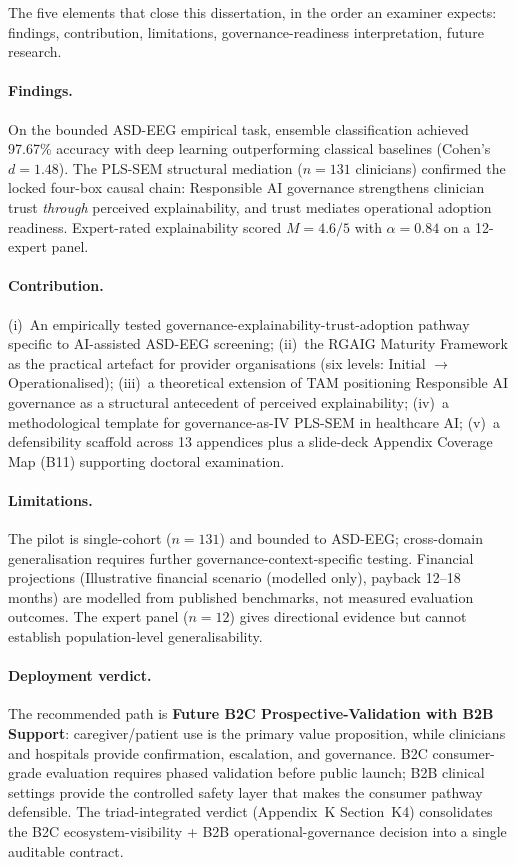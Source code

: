 \noindent The five elements that close this dissertation, in the order an examiner expects: findings, contribution, limitations, governance-readiness interpretation, future research.

\paragraph{Findings.} On the bounded ASD-EEG empirical task, ensemble classification achieved 97.67\% accuracy with deep learning outperforming classical baselines (Cohen's $d=1.48$). The PLS-SEM structural mediation ($n=131$ clinicians) confirmed the locked four-box causal chain: Responsible AI governance strengthens clinician trust \emph{through} perceived explainability, and trust mediates operational adoption readiness. Expert-rated explainability scored $M=4.6/5$ with $\alpha=0.84$ on a 12-expert panel.

\paragraph{Contribution.} (i)~An empirically tested governance-explainability-trust-adoption pathway specific to AI-assisted ASD-EEG screening; (ii)~the RGAIG Maturity Framework as the practical artefact for provider organisations (six levels: Initial $\to$ Operationalised); (iii)~a theoretical extension of TAM \cite{davis1989tam} positioning Responsible AI governance as a structural antecedent of perceived explainability; (iv)~a methodological template for governance-as-IV PLS-SEM in healthcare AI; (v)~a defensibility scaffold across 13 appendices plus a slide-deck Appendix Coverage Map (B11) supporting doctoral examination.

\paragraph{Limitations.} The pilot is single-cohort ($n=131$) and bounded to ASD-EEG; cross-domain generalisation requires further governance-context-specific testing. Financial projections (Illustrative financial scenario (modelled only), payback 12--18 months) are modelled from published benchmarks, not measured evaluation outcomes. The expert panel ($n=12$) gives directional evidence but cannot establish population-level generalisability.

\paragraph{Deployment verdict.} The recommended path is \textbf{Future B2C Prospective-Validation with B2B Support}: caregiver/patient use is the primary value proposition, while clinicians and hospitals provide confirmation, escalation, and governance. B2C consumer-grade evaluation requires phased validation before public launch; B2B clinical settings provide the controlled safety layer that makes the consumer pathway defensible. The triad-integrated verdict (Appendix~K Section~K4) consolidates the B2C ecosystem-visibility + B2B operational-governance decision into a single auditable contract.

